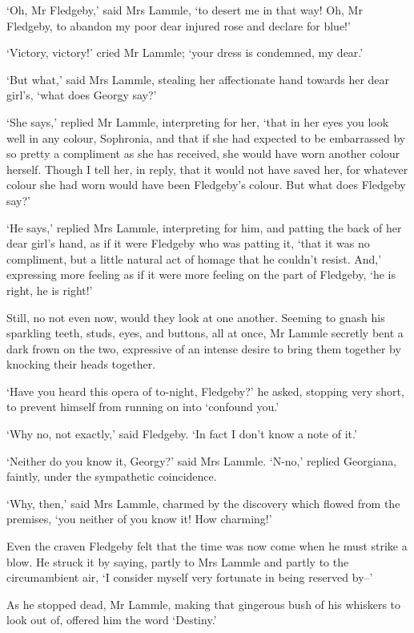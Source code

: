 ‘Oh, Mr Fledgeby,’ said Mrs Lammle, ‘to desert me in that way! Oh, Mr
Fledgeby, to abandon my poor dear injured rose and declare for blue!’

‘Victory, victory!’ cried Mr Lammle; ‘your dress is condemned, my dear.’

‘But what,’ said Mrs Lammle, stealing her affectionate hand towards her
dear girl’s, ‘what does Georgy say?’

‘She says,’ replied Mr Lammle, interpreting for her, ‘that in her eyes
you look well in any colour, Sophronia, and that if she had expected to
be embarrassed by so pretty a compliment as she has received, she would
have worn another colour herself. Though I tell her, in reply, that it
would not have saved her, for whatever colour she had worn would have
been Fledgeby’s colour. But what does Fledgeby say?’

‘He says,’ replied Mrs Lammle, interpreting for him, and patting the
back of her dear girl’s hand, as if it were Fledgeby who was patting it,
‘that it was no compliment, but a little natural act of homage that
he couldn’t resist. And,’ expressing more feeling as if it were more
feeling on the part of Fledgeby, ‘he is right, he is right!’

Still, no not even now, would they look at one another. Seeming to gnash
his sparkling teeth, studs, eyes, and buttons, all at once, Mr Lammle
secretly bent a dark frown on the two, expressive of an intense desire
to bring them together by knocking their heads together.

‘Have you heard this opera of to-night, Fledgeby?’ he asked, stopping
very short, to prevent himself from running on into ‘confound you.’

‘Why no, not exactly,’ said Fledgeby. ‘In fact I don’t know a note of
it.’

‘Neither do you know it, Georgy?’ said Mrs Lammle. ‘N-no,’ replied
Georgiana, faintly, under the sympathetic coincidence.

‘Why, then,’ said Mrs Lammle, charmed by the discovery which flowed from
the premises, ‘you neither of you know it! How charming!’

Even the craven Fledgeby felt that the time was now come when he must
strike a blow. He struck it by saying, partly to Mrs Lammle and partly
to the circumambient air, ‘I consider myself very fortunate in being
reserved by--’

As he stopped dead, Mr Lammle, making that gingerous bush of his
whiskers to look out of, offered him the word ‘Destiny.’

